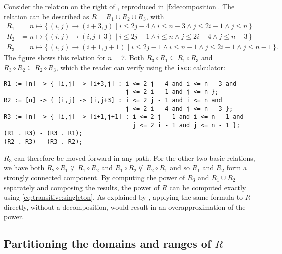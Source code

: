 \begin{example}
\label{ex:decomposition}
Consider the relation on the right of \textcite[Figure~2]{Beletska2009},
reproduced in \autoref{f:decomposition}.
The relation can be described as $R = R_1 \cup R_2 \cup R_3$,
with
$$
\begin{aligned}
R_1 &= n \mapsto \{\, (i,j) \to (i+3,j) \mid
i \le 2 j - 4 \wedge
i \le n - 3 \wedge
j \le 2 i - 1 \wedge
j \le n \,\}
\\
R_2 &= n \mapsto \{\, (i,j) \to (i,j+3) \mid
i \le 2 j - 1 \wedge
i \le n \wedge
j \le 2 i - 4 \wedge
j \le n - 3 \,\}
\\
R_3 &= n \mapsto \{\, (i,j) \to (i+1,j+1) \mid
i \le 2 j - 1 \wedge
i \le n - 1 \wedge
j \le 2 i - 1 \wedge
j \le n - 1\,\}
.
\end{aligned}
$$
The figure shows this relation for $n = 7$.
Both
$R_3 \circ R_1 \subseteq R_1 \circ R_3$
and
$R_3 \circ R_2 \subseteq R_2 \circ R_3$,
which the reader can verify using the {\tt iscc} calculator:
\begin{verbatim}
R1 := [n] -> { [i,j] -> [i+3,j] : i <= 2 j - 4 and i <= n - 3 and
                                  j <= 2 i - 1 and j <= n };
R2 := [n] -> { [i,j] -> [i,j+3] : i <= 2 j - 1 and i <= n and
                                  j <= 2 i - 4 and j <= n - 3 };
R3 := [n] -> { [i,j] -> [i+1,j+1] : i <= 2 j - 1 and i <= n - 1 and
                                    j <= 2 i - 1 and j <= n - 1 };
(R1 . R3) - (R3 . R1);
(R2 . R3) - (R3 . R2);
\end{verbatim}
$R_3$ can therefore be moved forward in any path.
For the other two basic relations, we have both
$R_2 \circ R_1 \not\subseteq R_1 \circ R_2$
and
$R_1 \circ R_2 \not\subseteq R_2 \circ R_1$
and so $R_1$ and $R_2$ form a strongly connected component.
By computing the power of $R_3$ and $R_1 \cup R_2$ separately
and composing the results, the power of $R$ can be computed exactly
using \eqref{eq:transitive:singleton}.
As explained by \textcite{Beletska2009}, applying the same formula
to $R$ directly, without a decomposition, would result in
an overapproximation of the power.
\end{example}

\subsection{Partitioning the domains and ranges of $R$}

